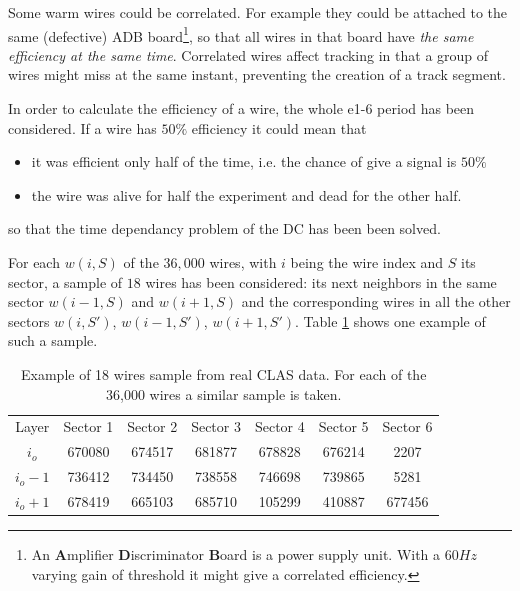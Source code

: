 Some warm wires could be correlated. For example they could be attached to the same (defective) 
ADB board\footnote{An {\bf A}mplifier {\bf D}iscriminator {\bf B}oard 
is a power supply unit. With a $60 Hz$ varying gain of threshold it might give a correlated efficiency.}, 
so that all wires in that board have {\it the same efficiency at the same time}.
Correlated wires affect tracking in that a group of wires might miss at the same instant, preventing the creation of a track segment.


In order to calculate the efficiency of a wire, the whole e1-6 period has been considered. If a wire has
 $50\%$ efficiency it could mean that
\begin{itemize}
\item it was efficient only half of the time, i.e. the chance of give a signal is $50\%$
\item the wire was alive for half the experiment and dead for the other half.
\end{itemize} 
so that the time dependancy problem of the DC has been been solved. 

For each  $w(i,S)$ of the $36,000$ wires, with $i$ being the wire index and $S$ its sector,
 a sample of $18$ wires has been considered:  its next neighbors in the same 
sector $w(i-1, S)$ and $w(i+1, S)$ and
the corresponding wires in all the other sectors $w(i, S')$, $w(i-1, S')$, $w(i+1, S')$.
Table \ref{tab:wire_sample} shows one example of such a sample.

\begin{table}[h]
 \begin{center}
  \begin{tabular}{ c c c c c c c }
   Layer & Sector 1 & Sector 2 & Sector 3 & Sector 4 & Sector 5 & Sector 6 \\
   $i_o$      & 670080 & 674517 & 681877 & 678828 & 676214 &   2207 \\
   $i_o - 1 $ & 736412 & 734450 & 738558 & 746698 & 739865 &   5281 \\
   $i_o + 1 $ & 678419 & 665103 & 685710 & 105299 & 410887 & 677456 \\
  \end{tabular}
 \caption[Example of 18 wires sample from real CLAS data]
         { Example of 18 wires sample from real CLAS data. For each of the 36,000 wires a similar sample is taken.}
 \label{tab:wire_sample}
 \end{center}
\end{table}

